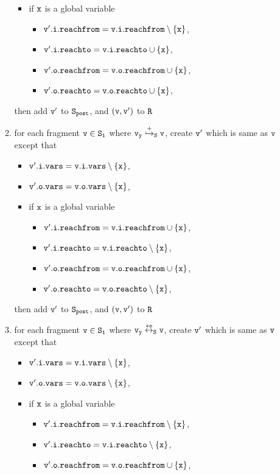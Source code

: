 \begin{itemize}
\begin{enumerate}
\begin{itemize}
\item if $\tt x$ is a global variable
\begin{itemize}
\item $\tt v'.i.reachfrom = v.i.reachfrom \setminus \{x\}$,
\item $\tt v'.i.reachto = v.i.reachto \cup \{x\}$,
 \item $\tt v'.o.reachfrom = v.o.reachfrom \cup \{x\}$,
 \item $\tt v'.o.reachto = v.o.reachto \cup \{x\}$,
\end{itemize}
\end{itemize}
then add $\tt v'$ to $\tt S_{post}$, and $\tt (v,v')$ to $\tt R$

\item for each fragment $\tt v \in S_1$ where $\tt v_y \overset{+}\hookrightarrow_S v$, create $\tt v'$ which is same as $\tt v$ except that
\begin{itemize}
\item $\tt v'.i.vars = v.i.vars \setminus \{x\}$,
\item $\tt v'.o.vars = v.o.vars \setminus \{x\}$,
\item if $\tt x$ is a global variable
\begin{itemize}
\item $\tt v'.i.reachfrom = v.i.reachfrom \cup \{x\}$,
\item $\tt v'.i.reachto = v.i.reachto \setminus \{x\}$,
 \item $\tt v'.o.reachfrom = v.o.reachfrom \cup \{x\}$,
 \item $\tt v'.o.reachto = v.o.reachto \setminus \{x\}$,
\end{itemize}
\end{itemize}
then add $\tt v'$ to $\tt S_{post}$, and $\tt (v,v')$ to $\tt R$
\item for each fragment $\tt v \in S_1$ where $\tt v_y \overset{*o}\leftrightarrow_S v$, create $\tt v'$ which is same as $\tt v$ except that
\begin{itemize}
\item $\tt v'.i.vars = v.i.vars \setminus \{x\}$,
\item $\tt v'.o.vars = v.o.vars \setminus \{x\}$,
\item if $\tt x$ is a global variable
\begin{itemize}
\item $\tt v'.i.reachfrom = v.i.reachfrom \setminus \{x\}$,
\item $\tt v'.i.reachto = v.i.reachto \setminus \{x\}$,
\item $\tt v'.o.reachfrom = v.o.reachfrom \cup \{x\}$,

\end{itemize}
\end{itemize}
\end{enumerate}
\end{itemize}
